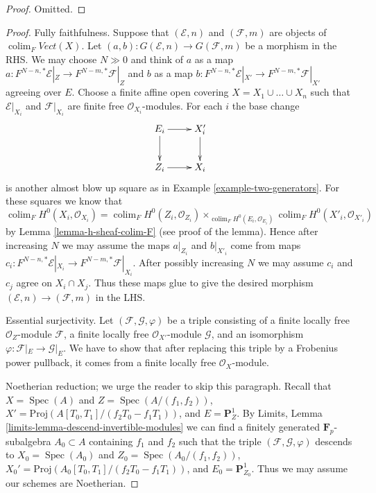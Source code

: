 \documentclass[10pt,a4paper]{amsart}
\theoremstyle{plain}
\theoremstyle{definition}
\theoremstyle{remark}
\numberwithin{equation}{subsection}
\def\colim{\mathop{\mathrm{colim}}\nolimits}
\def\Spec{\mathop{\mathrm{Spec}}}
\begin{document}
\begin{proof}
Omitted.
\end{proof}

\begin{proof}
Fully faithfulness. Suppose that $(\mathcal{E}, n)$ and
$(\mathcal{F}, m)$ are objects of $\colim_F \textit{Vect}(X)$.
Let $(a, b) : G(\mathcal{E}, n) \to G(\mathcal{F}, m)$
be a morphism in the RHS. We may choose $N \gg 0$ and
think of $a$ as a map
$a : F^{N - n, *}\mathcal{E}|_Z \to F^{N - m, *}\mathcal{F}|_Z$
and $b$ as a map
$b : F^{N - n, *}\mathcal{E}|_{X'} \to F^{N - m, *}\mathcal{F}|_{X'}$
agreeing over $E$.
Choose a finite affine open covering
$X = X_1 \cup \ldots \cup X_n$ such that $\mathcal{E}|_{X_i}$
and $\mathcal{F}|_{X_i}$ are finite free $\mathcal{O}_{X_i}$-modules.
For each $i$ the base change
$$
\xymatrix{
E_i \ar[r] \ar[d] & X'_i \ar[d] \\
Z_i \ar[r] & X_i
}
$$
is another almost blow up square as in Example \ref{example-two-generators}.
For these squares we know that
$$
\colim_F H^0(X_i, \mathcal{O}_{X_i}) =
\colim_F H^0(Z_i, \mathcal{O}_{Z_i})
\times_{\colim_F H^0(E_i, \mathcal{O}_{E_i})}
\colim_F H^0(X'_i, \mathcal{O}_{X'_i})
$$
by Lemma \ref{lemma-h-sheaf-colim-F} (see proof of the lemma).
Hence after increasing $N$ we may assume
the maps $a|_{Z_i}$ and $b|_{X'_i}$ come from
maps $c_i : F^{N - n, *}\mathcal{E}|_{X_i} \to F^{N - m, *}\mathcal{F}|_{X_i}$.
After possibly increasing $N$ we may assume $c_i$ and $c_j$
agree on $X_i \cap X_j$. Thus these maps glue to give the
desired morphism $(\mathcal{E}, n) \to (\mathcal{F}, m)$
in the LHS.

\medskip\noindent
Essential surjectivity. Let $(\mathcal{F}, \mathcal{G}, \varphi)$ be a
triple consisting of
a finite locally free $\mathcal{O}_Z$-module $\mathcal{F}$,
a finite locally free $\mathcal{O}_{X'}$-module $\mathcal{G}$, and
an isomorphism $\varphi : \mathcal{F}|_E \to \mathcal{G}|_E$.
We have to show that after replacing this triple by a Frobenius
power pullback, it comes from a finite locally free $\mathcal{O}_X$-module.

\medskip\noindent
Noetherian reduction; we urge the reader to skip this paragraph.
Recall that $X = \Spec(A)$ and $Z = \Spec(A/(f_1, f_2))$,
$X' = \text{Proj}(A[T_0, T_1]/(f_2T_0 - f_1T_1))$, and
$E = \mathbf{P}^1_Z$. By Limits, Lemma
\ref{limits-lemma-descend-invertible-modules}
we can find a finitely generated $\mathbf{F}_p$-subalgebra
$A_0 \subset A$ containing $f_1$ and $f_2$ such that the triple
$(\mathcal{F}, \mathcal{G}, \varphi)$ descends to
$X_0 = \Spec(A_0)$ and $Z_0 = \Spec(A_0/(f_1, f_2))$,
$X_0' = \text{Proj}(A_0[T_0, T_1]/(f_2T_0 - f_1T_1))$, and
$E_0 = \mathbf{P}^1_{Z_0}$. Thus we may assume our schemes
are Noetherian.


\end{proof}
\end{document}
